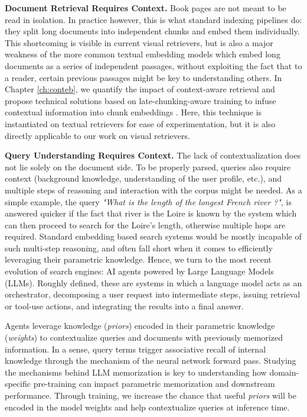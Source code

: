 \noindent\textbf{Document Retrieval Requires Context.} Book pages are not meant to be read in isolation. In practice however, this is what standard indexing pipelines do: they split long documents into independent chunks and embed them individually.
This shortcoming is visible in current visual retrievers, but is also a major weakness of the more common textual embedding models which embed long documents as a series of independent passages, without exploiting the fact that to a reader, certain previous passages might be key to understanding others. In Chapter \autoref{ch:conteb}, we quantify the impact of context-aware retrieval and propose technical solutions based on late-chunking-aware training to infuse contextual information into chunk embeddings . Here, this technique is instantiated on textual retrievers for ease of experimentation, but it is also directly applicable to our work on visual retrievers.


\noindent\textbf{Query Understanding Requires Context.}
The lack of contextualization does not lie solely on the document side. To be properly parsed, queries also require context (background knowledge, understanding of the user profile, etc.), and multiple steps of reasoning and interaction with the corpus might be needed. As a simple example, the query \emph{"What is the length of the longest French river ?"}, is answered quicker if the fact that river is the Loire is known by the system which can then proceed to search for the Loire's length, otherwise multiple hops are required. Standard embedding based search systems would be mostly incapable of such multi-step reasoning, and often fall short when it comes to efficiently leveraging their parametric knowledge. Hence, we turn to the most recent evolution of search engines: AI agents powered by Large Language Models (LLMs). Roughly defined, these are systems in which a language model acts as an orchestrator, decomposing a user request into intermediate steps, issuing retrieval or tool-use actions, and integrating the results into a final answer.

Agents leverage knowledge (\emph{priors}) encoded in their parametric knowledge (\emph{weights}) to contextualize queries and documents with previously memorized information. In a sense, query terms trigger associative recall of internal knowledge through the mechanism of the neural network forward pass. Studying the mechanisms behind LLM memorization is key to understanding how domain-specific pre-training can impact parametric memorization and downstream performance. Through training, we increase the chance that useful \emph{priors} will be encoded in the model weights and help contextualize queries at inference time.

